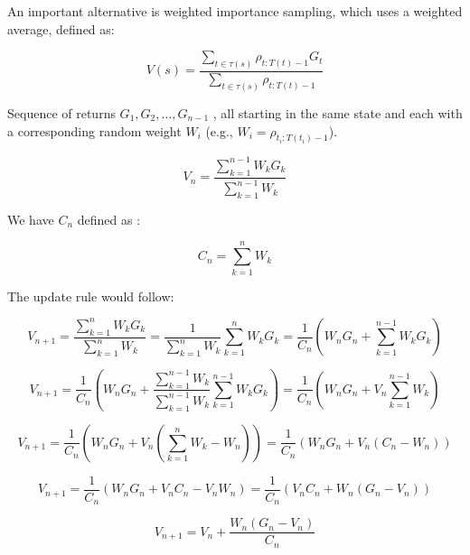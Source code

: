 \documentclass[11pt]{article}
\begin{document}
    An important alternative is weighted importance sampling, which uses a weighted average, defined as:

    \begin{equation}
        V(s) = \frac{ \sum_{t \in \tau(s)} \rho_{t:T(t)-1} G_t }{\sum_{t \in \tau(s)} \rho_{t:T(t)-1}}
    \end{equation}

    Sequence of returns $G_1 , G_2 , \dots , G_{n-1}$ , all starting in the same state and each with a corresponding random weight $W_i$ (e.g., $ W_i = \rho_{ t_i : T (t_i)-1} $).

    \begin{equation}
        V_{n}= \frac{\sum_{k=1}^{n-1} W_{k} G_{k}}{\sum_{k=1}^{n-1} W_{k}}
    \end{equation}

    We have $C_n$ defined as :

    \begin{equation}
        C_{n}= \sum_{k=1}^{n} W_{k}
    \end{equation}

    The update rule would follow:

    \begin{equation}
        V_{n+1}=\frac{ \sum_{k=1}^{n} W_{k} G_{k}  }{ \sum_{k=1}^{n} W_{k} } = \frac{ 1 }{ \sum_{k=1}^{n} W_{k} } \sum_{k=1}^{n} W_{k} G_{k} = \frac{ 1 }{ C_{n} } ( W_{n} G_{n} +  \sum_{k=1}^{n - 1} W_{k} G_{k} )
    \end{equation}

    \begin{equation}
        V_{n+1} = \frac{ 1 }{ C_{n} } ( W_{n} G_{n} +  \frac{ \sum_{k=1}^{n-1} W_{k} }{ \sum_{k=1}^{n-1} W_{k} } \sum_{k=1}^{n - 1} W_{k} G_{k} ) = \frac{ 1 }{ C_{n} } ( W_{n} G_{n} + V_{n} \sum_{k=1}^{n-1} W_{k}  )
    \end{equation}

    \begin{equation}
        V_{n+1} = \frac{ 1 }{ C_{n} } ( W_{n} G_{n} + V_{n} (\sum_{k=1}^{n} W_{k} - W_{n}) ) = \frac{ 1 }{ C_{n} } ( W_{n} G_{n} + V_{n} (C_{n} - W_{n}) )
    \end{equation}

    \begin{equation}
        V_{n+1} = \frac{ 1 }{ C_{n} } ( W_{n} G_{n} + V_{n} C_{n} - V_{n}  W_{n} ) = \frac{ 1 }{ C_{n} } ( V_{n} C_{n} + W_{n} ( G_{n} - V_{n} ) )
    \end{equation}

    \begin{equation}
        V_{n+1} = V_{n} +  \frac{ W_{n} ( G_{n} - V_{n} ) }{ C_{n}}
    \end{equation}
\end{document}
